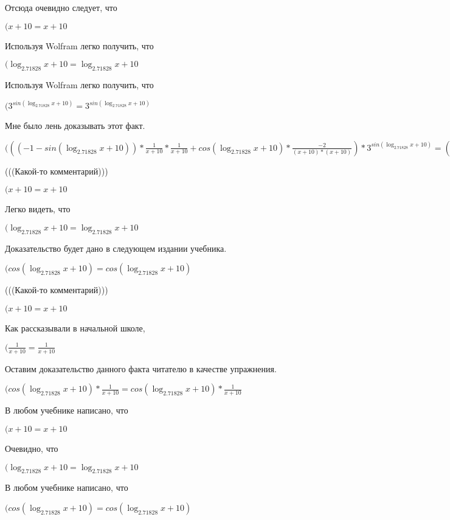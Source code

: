 \documentclass[12pt,a4paper,fleqn]{article}
\theoremstyle{definition}
\begin{document}
Отсюда очевидно следует, что

$( x  +  10  =  x  +  10 $

Используя Wolfram легко получить, что

$(\log_{ 2.71828 }{ x  +  10 } = \log_{ 2.71828 }{ x  +  10 }$

Используя Wolfram легко получить, что

$({ 3 }^{sin(\log_{ 2.71828 }{ x  +  10 })} = { 3 }^{sin(\log_{ 2.71828 }{ x  +  10 })}$

Мне было лень доказывать этот факт.

$((( -1  - sin(\log_{ 2.71828 }{ x  +  10 })) * \frac{ 1 }{ x  +  10 }
 * \frac{ 1 }{ x  +  10 }
 + cos(\log_{ 2.71828 }{ x  +  10 }) * \frac{ -2 }{( x  +  10 ) * ( x  +  10 )}
) * { 3 }^{sin(\log_{ 2.71828 }{ x  +  10 })} = (( -1  - sin(\log_{ 2.71828 }{ x  +  10 })) * \frac{ 1 }{ x  +  10 }
 * \frac{ 1 }{ x  +  10 }
 + cos(\log_{ 2.71828 }{ x  +  10 }) * \frac{ -2 }{( x  +  10 ) * ( x  +  10 )}
) * { 3 }^{sin(\log_{ 2.71828 }{ x  +  10 })}$

(((Какой-то комментарий)))

$( x  +  10  =  x  +  10 $

Легко видеть, что

$(\log_{ 2.71828 }{ x  +  10 } = \log_{ 2.71828 }{ x  +  10 }$

Доказательство будет дано в следующем издании учебника.

$(cos(\log_{ 2.71828 }{ x  +  10 }) = cos(\log_{ 2.71828 }{ x  +  10 })$

(((Какой-то комментарий)))

$( x  +  10  =  x  +  10 $

Как рассказывали в начальной школе,

$(\frac{ 1 }{ x  +  10 }
 = \frac{ 1 }{ x  +  10 }
$

Оставим доказательство данного факта читателю в качестве упражнения.

$(cos(\log_{ 2.71828 }{ x  +  10 }) * \frac{ 1 }{ x  +  10 }
 = cos(\log_{ 2.71828 }{ x  +  10 }) * \frac{ 1 }{ x  +  10 }
$

В любом учебнике написано, что

$( x  +  10  =  x  +  10 $

Очевидно, что

$(\log_{ 2.71828 }{ x  +  10 } = \log_{ 2.71828 }{ x  +  10 }$

В любом учебнике написано, что

$(cos(\log_{ 2.71828 }{ x  +  10 }) = cos(\log_{ 2.71828 }{ x  +  10 })$
\end{document}
